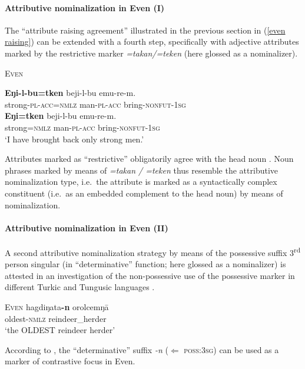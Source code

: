 \paragraph{Attributive nominalization in Even (I)}
The “attribute raising agreement” illustrated in the previous section in (\ref{even raising}) can be extended with a fourth step, specifically with adjective attributes marked by the restrictive marker \textit{=takan/\-=teken} (here glossed as a nominalizer).
\begin{exe}
\ex \textsc{Even} \cite[32]{malchukov1995}
\begin{xlist}
\ex 
\gll	\textbf{Eŋi-l-bu=tken} beji-l-bu emu-re-m.\\
	strong-\textsc{pl}-\textsc{acc}=\textsc{nmlz} man-\textsc{pl}-\textsc{acc} bring-\textsc{nonfut}-\textsc{1sg}\\
\ex	
\gll	* \textbf{Eŋi=tken} beji-l-bu emu-re-m.\\
	{} strong=\textsc{nmlz} man-\textsc{pl}-\textsc{acc} bring-\textsc{nonfut}-\textsc{1sg}\\
\glt	‘I have brought back only strong men.’
\end{xlist}
\end{exe}
Attributes marked as “restrictive” obligatorily agree with the head noun \cite[32]{malchukov1995}. Noun phrases marked by means of \textit{=takan / =teken} thus resemble the attributive nominalization type, i.e.~the attribute is marked as a syntactically complex constituent (i.e.~as an embedded complement to the head noun) by means of nominalization.

\paragraph{Attributive nominalization in Even (II)}
A second attributive nominalization strategy by means of the possessive suffix 3\textsuperscript{rd} person singular (in “determinative” function; here glossed as a nominalizer) is attested in an investigation of the non-possessive use of the possessive marker in different Turkic and Tungusic languages \citep{benzing1993b}.
\newpage
\begin{exe}
\ex \textsc{Even} \cite[17–18 Footnote 58]{benzing1993b}
\gll	hagdiŋata\textbf{-n} orolcemŋā\\
	oldest-\textsc{nmlz} reindeer\_herder\\
\glt	‘the OLDEST reindeer herder’%
\end{exe}
According to \citet[17–18 Footnote 58]{benzing1993b}, the “determinative” suffix {\it -n} ($\Leftarrow$ \textsc{poss:3sg}) can be used as a marker of contrastive focus in Even.

